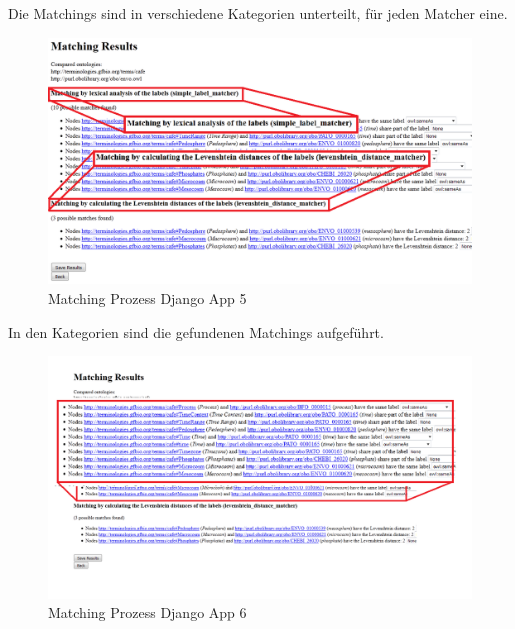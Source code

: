 		\pagebreak[4]
		Die Matchings sind in verschiedene Kategorien unterteilt, für
		jeden Matcher eine.
		\begin{figure}[h!]
		\centering
		\includegraphics[width=1.0\textwidth]{pics/SimpleOntologyMatcher-Process5.png}
		\caption{Matching Prozess Django App 5}
		\label{fig9}
		\end{figure}
		
		\pagebreak[4]
		In den Kategorien sind die gefundenen Matchings aufgeführt.
		\begin{figure}[h!]
		\centering
		\includegraphics[width=1.0\textwidth]{pics/SimpleOntologyMatcher-Process6.png}
		\caption{Matching Prozess Django App 6}
		\label{fig10}
		\end{figure}
		

